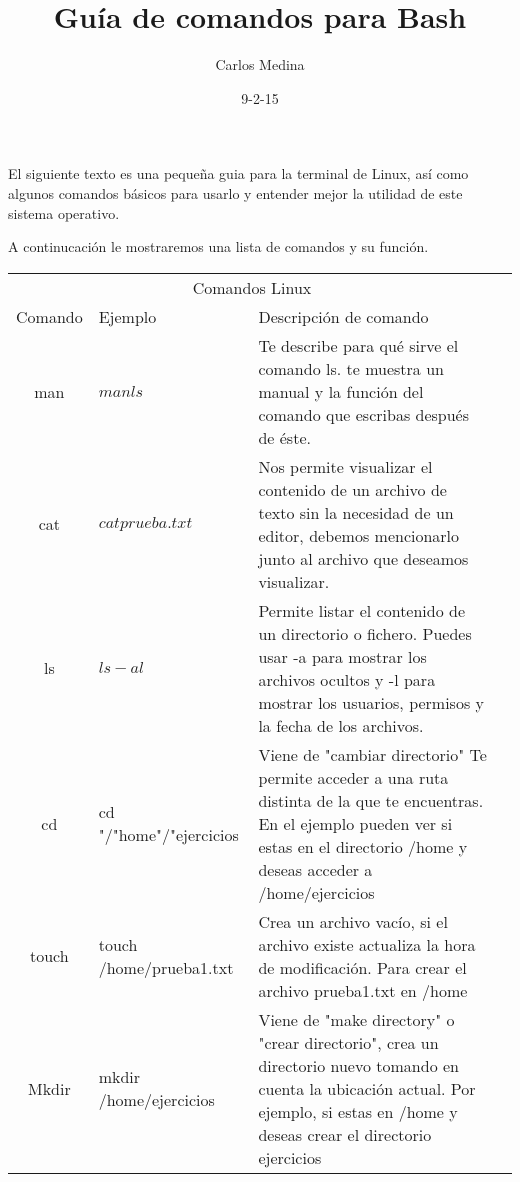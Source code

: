\documentclass[12pt]{article}
\title{Guía de comandos para Bash}
\author{Carlos Medina}
\date{9-2-15}
\begin{document}
\maketitle
















El siguiente texto es una pequeña guia para la terminal de Linux, así como algunos comandos básicos para usarlo y entender mejor la utilidad de este sistema operativo.








A continucación le mostraremos una lista de comandos y su función.










\begin{tabular}{|c|p{3cm}|p{10cm}|p{3cm}|}
    \cline{1-3}
    \multicolumn{3}{|c|}{Comandos Linux}\\
    \cline{1-3}
    Comando & Ejemplo & Descripción de comando\\
    \cline{1-3}
    \centering
    man & $man ls$ & Te describe para qué sirve el comando ls. te muestra un manual y la función del comando que escribas después de éste.\\
    \hline
    cat & $cat prueba.txt$ &Nos permite visualizar el contenido de un archivo de texto sin la necesidad de un editor, debemos mencionarlo junto al archivo que deseamos visualizar.\\
    \hline
    ls & $ls -al$ &Permite listar el contenido de un directorio o fichero. Puedes usar -a para mostrar los archivos ocultos y -l para mostrar los usuarios, permisos y la fecha de los archivos. \\
    \hline
    cd & cd "/"home"/"ejercicios & Viene de "cambiar directorio" Te permite acceder a una ruta distinta de la que te encuentras. En el ejemplo pueden ver si estas en el directorio /home y deseas acceder a /home/ejercicios\\
    \hline 
    touch & touch /home/prueba1.txt & Crea un archivo vacío, si el archivo existe actualiza la hora de modificación. Para crear el archivo prueba1.txt en /home\\
    \hline 
    Mkdir & mkdir /home/ejercicios & Viene de "make directory" o "crear directorio", crea un directorio nuevo tomando en cuenta la ubicación actual. Por ejemplo, si estas en /home y deseas crear el directorio ejercicios\\
    \hline 
  \end{tabular}
  
\end{document}
